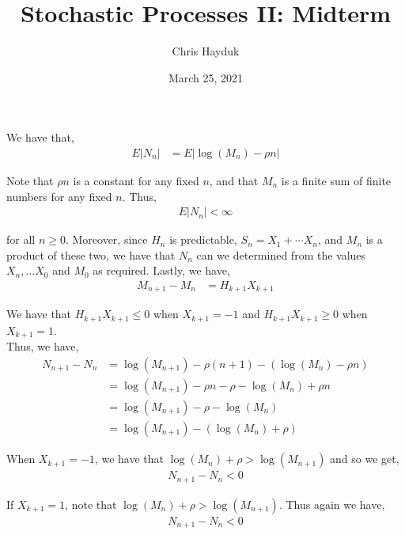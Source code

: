 \documentclass[12pt]{article}
\newenvironment{problem}[2][Problem]{\begin{trivlist}
\item[\hskip \labelsep {\bfseries #1}\hskip \labelsep {\bfseries #2.}]}{\end{trivlist}}
\begin{document}
\title{Stochastic Processes II: Midterm}

\author{Chris Hayduk}
\date{March 25, 2021}

\maketitle

\begin{problem}{I}
\end{problem}

We have that,
\begin{align*}
E|N_n| &= E|\log(M_n) - \rho n|
\end{align*}

Note that $\rho n$ is a constant for any fixed $n$, and that $M_n$ is a finite sum of finite numbers for any fixed $n$. Thus,
\begin{align*}
E|N_n| < \infty
\end{align*}

for all $n \geq 0$. Moreover, since $H_n$ is predictable, $S_n = X_1 + \cdots X_n$, and $M_n$ is a product of these two, we have that $N_n$ can we determined from the values $X_n, \ldots X_0$ and $M_0$ as required. Lastly, we have,
\begin{align*}
M_{n+1} - M_n &= H_{k+1}X_{k+1}
\end{align*}

We have that $H_{k+1}X_{k+1} \leq 0$ when $X_{k+1} = -1$ and $H_{k+1}X_{k+1} \geq 0$ when $X_{k+1} = 1$.\\

Thus, we have,
\begin{align*}
N_{n+1} - N_{n} &= \log(M_{n+1}) - \rho (n+1) - (\log(M_{n}) - \rho n)\\
&= \log(M_{n+1}) - \rho n - \rho - \log(M_{n}) + \rho n\\
&= \log(M_{n+1}) - \rho - \log(M_{n})\\
&= \log(M_{n+1}) - (\log(M_{n}) + \rho)
\end{align*}

When $X_{k+1} = -1$, we have that $\log(M_n) + \rho > \log(M_{n+1})$ and so we get,
\begin{align*}
N_{n+1} - N_n < 0
\end{align*}

If $X_{k+1} = 1$, note that $\log(M_n) + \rho > \log(M_{n+1})$. Thus again we have,
\begin{align*}
N_{n+1} - N_n < 0
\end{align*}
\end{document}
